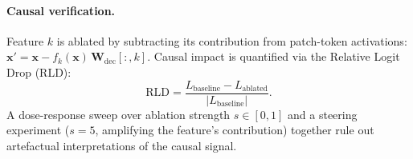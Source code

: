 \paragraph{Causal verification.}
Feature $k$ is ablated by subtracting its contribution from patch-token activations: $\mathbf{x}' = \mathbf{x} - f_k(\mathbf{x})\,\mathbf{W}_\text{dec}[:,k]$. Causal impact is quantified via the Relative Logit Drop (RLD):
\begin{equation}
  \text{RLD} = \frac{L_\text{baseline} - L_\text{ablated}}{|L_\text{baseline}|}.
\end{equation}
A dose-response sweep over ablation strength $s\!\in\![0,1]$ and a steering experiment ($s{=}5$, amplifying the feature's contribution) together rule out artefactual interpretations of the causal signal.
